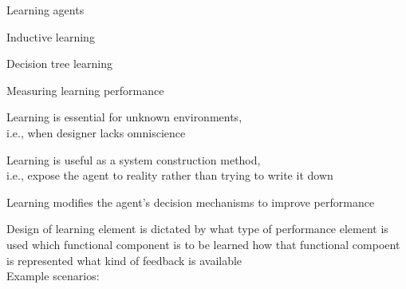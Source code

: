 \documentclass{article}
\begin{document}
\begin{huge}

\sf


\blob Learning agents

\blob Inductive learning

\blob Decision tree learning

\blob Measuring learning performance



Learning is essential for unknown environments,\\
i.e., when designer lacks omniscience

Learning is useful as a system construction method,\\
i.e., expose the agent to reality rather than trying to write it down

Learning modifies the agent's decision mechanisms to improve performance



\textwidth
{}





Design of learning element is dictated by\al
\blob what type of performance element is used\al
\blob which functional component is to be learned\al
\blob how that functional compoent is represented\al
\blob what kind of feedback is available\\
Example scenarios:


\end{huge}
\end{document}
